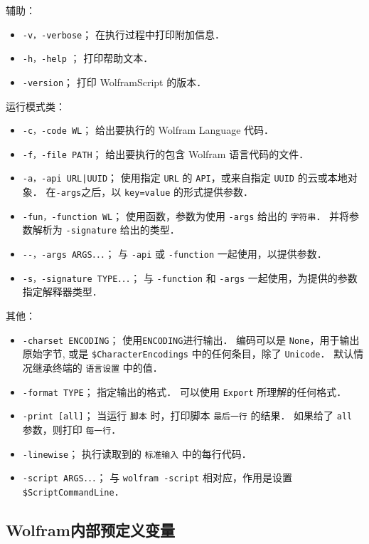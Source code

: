 辅助：
\begin{itemize}
\item \verb`-v，-verbose`； 在执行过程中打印附加信息．
\item \verb`-h，-help` ； 打印帮助文本．
\item \verb`-version`； 打印 WolframScript 的版本．
\end{itemize}
运行模式类：
\begin{itemize}
\item \verb`-c，-code WL`； 给出要执行的 Wolfram Language 代码．
\item \verb`-f，-file PATH`； 给出要执行的包含 Wolfram 语言代码的文件．
\item \verb`-a，-api URL|UUID`； 使用指定 \verb`URL` 的 \verb`API`，或来自指定 \verb`UUID` 的云或本地对象． 
在\verb`-args`之后，以 \verb`key=value` 的形式提供参数．
\item \verb`-fun，-function WL`； 使用函数，参数为使用 \verb`-args` 给出的 \verb`字符串`．
并将参数解析为 \verb`-signature` 给出的类型．
\item \verb`--，-args ARGS．．．`； 与 \verb`-api` 或 \verb`-function` 一起使用，以提供参数．
\item \verb`-s，-signature TYPE．．．`； 与 \verb`-function` 和 \verb`-args` 一起使用，为提供的参数指定解释器类型．
\end{itemize}
其他：
\begin{itemize}
\item \verb`-charset ENCODING`； 使用\verb`ENCODING`进行输出． 编码可以是 \verb`None`，用于输出原始字节,
或是 \verb`$CharacterEncodings` 中的任何条目，除了 \verb`Unicode`． 默认情况继承终端的 \verb`语言设置` 中的值．
\item \verb`-format TYPE`； 指定输出的格式． 可以使用 \verb`Export` 所理解的任何格式．
\item \verb`-print [all]`； 当运行 \verb`脚本` 时，打印脚本 \verb`最后一行` 的结果． 如果给了 \verb`all` 参数，则打印 \verb`每一行`．
\item \verb`-linewise`； 执行读取到的 \verb`标准输入` 中的每行代码．
\item \verb`-script ARGS．．．`； 与 \verb`wolfram -script` 相对应，作用是设置 \verb`$ScriptCommandLine`．
\end{itemize}

\subsection{Wolfram内部预定义变量}


